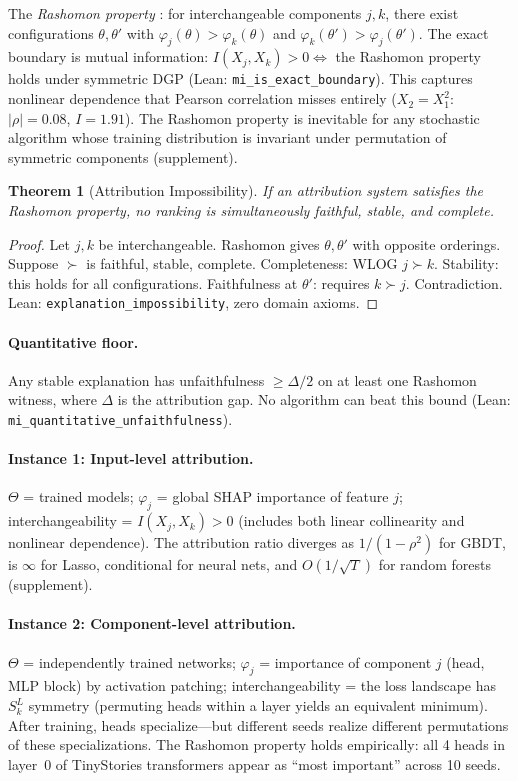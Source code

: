 \documentclass{article}
\newtheorem{theorem}{Theorem}
\newcommand{\GBDT}{\textsc{GBDT}}
\begin{document}
The \emph{Rashomon property} \citep{rudin2024amazing}: for interchangeable components $j, k$, there exist configurations $\theta, \theta'$ with $\varphi_j(\theta) > \varphi_k(\theta)$ and $\varphi_k(\theta') > \varphi_j(\theta')$. The exact boundary is mutual information: $I(X_j, X_k) > 0 \Leftrightarrow$ the Rashomon property holds under symmetric DGP (Lean: \texttt{mi\_is\_exact\_boundary}). This captures nonlinear dependence that Pearson correlation misses entirely ($X_2 = X_1^2$: $|\rho| = 0.08$, $I = 1.91$). The Rashomon property is inevitable for any stochastic algorithm whose training distribution is invariant under permutation of symmetric components (supplement).

\begin{theorem}[Attribution Impossibility]
\label{thm:impossibility}
If an attribution system satisfies the Rashomon property, no ranking is simultaneously faithful, stable, and complete.
\end{theorem}

\begin{proof}
Let $j, k$ be interchangeable. Rashomon gives $\theta, \theta'$ with opposite orderings. Suppose $\succ$ is faithful, stable, complete. Completeness: WLOG $j \succ k$. Stability: this holds for all configurations. Faithfulness at $\theta'$: requires $k \succ j$. Contradiction. \hfill Lean: \texttt{explanation\_impossibility}, zero domain axioms.
\end{proof}

\paragraph{Quantitative floor.}
Any stable explanation has unfaithfulness $\geq \Delta/2$ on at least one Rashomon witness, where $\Delta$ is the attribution gap. No algorithm can beat this bound (Lean: \texttt{mi\_quantitative\_unfaithfulness}).

\paragraph{Instance 1: Input-level attribution.}
$\Theta$ = trained models; $\varphi_j$ = global SHAP importance of feature $j$; interchangeability = $I(X_j, X_k) > 0$ (includes both linear collinearity and nonlinear dependence).
The attribution ratio diverges as $1/(1{-}\rho^2)$ for \GBDT{}, is $\infty$ for Lasso, conditional for neural nets, and $O(1/\sqrt{T})$ for random forests (supplement).

\paragraph{Instance 2: Component-level attribution.}
$\Theta$ = independently trained networks; $\varphi_j$ = importance of component $j$ (head, MLP block) by activation patching; interchangeability = the loss landscape has $S_k^L$ symmetry (permuting heads within a layer yields an equivalent minimum). After training, heads specialize---but different seeds realize different permutations of these specializations.
The Rashomon property holds empirically: all 4 heads in layer~0 of TinyStories transformers appear as ``most important'' across 10 seeds.
\end{document}
